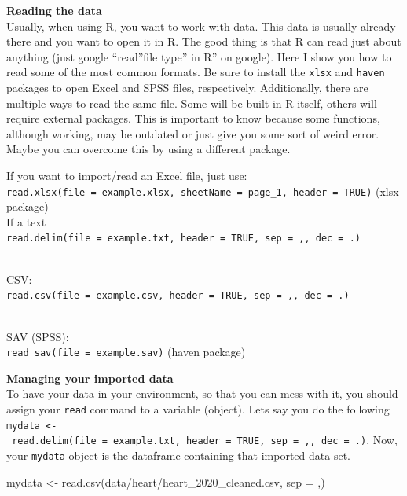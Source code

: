 \documentclass[
]{book}
\newenvironment{Shaded}{\begin{snugshade}}{\end{snugshade}}
\newcommand{\AttributeTok}[1]{\textcolor[rgb]{0.77,0.63,0.00}{#1}}
\newcommand{\FunctionTok}[1]{\textcolor[rgb]{0.00,0.00,0.00}{#1}}
\newcommand{\NormalTok}[1]{#1}
\newcommand{\OtherTok}[1]{\textcolor[rgb]{0.56,0.35,0.01}{#1}}
\newcommand{\StringTok}[1]{\textcolor[rgb]{0.31,0.60,0.02}{#1}}
\begin{document}
\textbf{Reading the data}\\
Usually, when using R, you want to work with data.
This data is usually already there and you want to open it in R.
The good thing is that R can read just about anything (just google ``read''file type'' in R'' on google).
Here I show you how to read some of the most common formats.
Be sure to install the \texttt{xlsx} and \texttt{haven} packages to open Excel and SPSS files, respectively.
Additionally, there are multiple ways to read the same file.
Some will be built in R itself, others will require external packages.
This is important to know because some functions, although working, may be outdated or just give you some sort of weird error.
Maybe you can overcome this by using a different package.

If you want to import/read an Excel file, just use:\\
\texttt{read.xlsx(file\ =\ \textquotesingle{}example.xlsx\textquotesingle{},\ sheetName\ =\ \textquotesingle{}page\_1\textquotesingle{},\ header\ =\ TRUE)} (xlsx package)\\
If a text\\
\texttt{read.delim(file\ =\ \textquotesingle{}example.txt\textquotesingle{},\ header\ =\ TRUE,\ sep\ =\ \textquotesingle{},\textquotesingle{},\ dec\ =\ \textquotesingle{}.\textquotesingle{})}\strut \\
CSV:\\
\texttt{read.csv(file\ =\ \textquotesingle{}example.csv\textquotesingle{},\ header\ =\ TRUE,\ sep\ =\ \textquotesingle{},\textquotesingle{},\ dec\ =\ \textquotesingle{}.\textquotesingle{})}\strut \\
SAV (SPSS):\\
\texttt{read\_sav(file\ =\ \textquotesingle{}example.sav\textquotesingle{})} (haven package)

\textbf{Managing your imported data}\\
To have your data in your environment, so that you can mess with it, you should assign your \texttt{read} command to a variable (object).
Lets say you do the following \texttt{mydata\ \textless{}-\ read.delim(file\ =\ \textquotesingle{}example.txt\textquotesingle{},\ header\ =\ TRUE,\ sep\ =\ \textquotesingle{},\textquotesingle{},\ dec\ =\ \textquotesingle{}.\textquotesingle{})}.
Now, your \texttt{mydata} object is the dataframe containing that imported data set.

\begin{Shaded}
\begin{Highlighting}[]
\NormalTok{mydata }\OtherTok{\textless{}{-}} \FunctionTok{read.csv}\NormalTok{(}\StringTok{\textquotesingle{}data/heart/heart\_2020\_cleaned.csv\textquotesingle{}}\NormalTok{, }\AttributeTok{sep =} \StringTok{\textquotesingle{},\textquotesingle{}}\NormalTok{)}
\end{Highlighting}
\end{Shaded}
\end{document}
